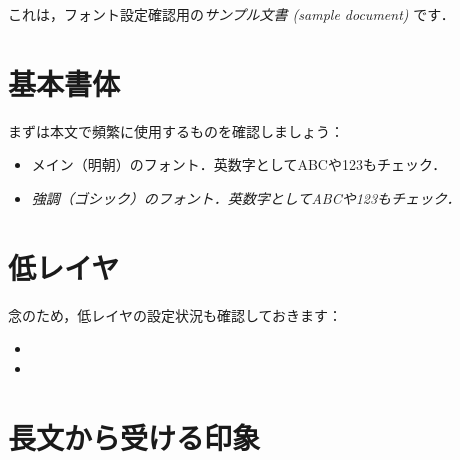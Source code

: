 \documentclass[autodetect-engine, dvi=dvipdfmx]{wtarticle}
\begin{document}
\maketitle

これは，フォント設定確認用の\emph{サンプル文書 (sample document) }です．

\section{基本書体}

まずは本文で頻繁に使用するものを確認しましょう：
%
\begin{itemize}
\item メイン（明朝）のフォント．英数字としてABCや123もチェック．
\item \emph{強調（ゴシック）のフォント．英数字としてABCや123もチェック．}
\end{itemize}

\section{低レイヤ}

念のため，低レイヤの設定状況も確認しておきます：
%
\begin{itemize}
\item {}
\item {}
\end{itemize}

\section{長文から受ける印象}

%
\emph{}%
\end{document}
